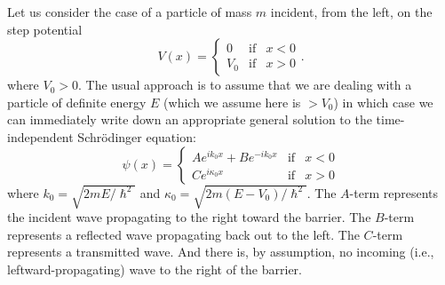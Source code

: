 \documentclass[aps,prc,onecolumn,letterpaper,floatfix,12pt]{revtex4}
\renewcommand{\hbar}{\hslash}
\begin{document}
Let us consider the case of a particle of mass $m$ incident, from the
left, on the step potential
\begin{equation}
V(x) = \left\{ 
\begin{array}{lcc}
0 & \text{if} & x<0 \\
V_0 & \text{if} & x>0
\end{array}
\right. .
\end{equation}
where $V_0 > 0$.
The usual approach is to assume that we are dealing with a particle of
definite energy $E$ (which we assume here is $> V_0$) in which case we
can immediately write down an appropriate general solution to the
time-independent Schr\"odinger equation:
\begin{equation}
\psi(x) = \left\{
\begin{array}{lcc}
A e^{i k_0 x} + B e^{-i k_0 x} & \text{if} & x<0 \\
C e^{i \kappa_0 x} & \text{if} & x>0
\end{array}
\right.
\label{step-psi}
\end{equation}
where $k_0 = \sqrt{2mE/\hbar^2}$ and $\kappa_0 =
\sqrt{2m(E-V_0)/\hbar^2}$.  The $A$-term represents the incident wave
propagating to the right toward the barrier.  The $B$-term represents a
reflected wave propagating back out to the left.  The $C$-term
represents a transmitted wave.  And there is, by assumption, no
incoming (i.e., leftward-propagating) wave to the right of the
barrier.  
\end{document}
